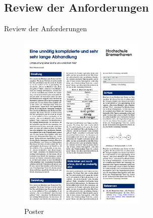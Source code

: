 \subsection{Review der Anforderungen}

Review der Anforderungen


\begin{figure}[!ht]
	\centering
	\includegraphics[width=0.54\textwidth]{src/anhang/abbildungen/poster.png}
	\caption{Poster}
	\label{picturedposter}
\end{figure}
